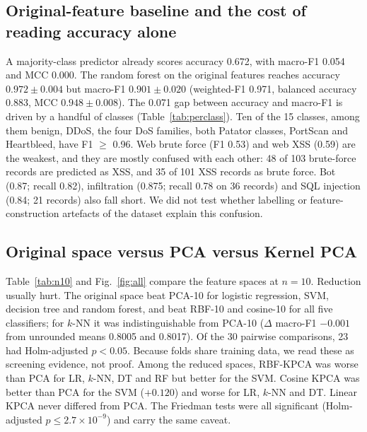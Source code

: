 \documentclass[runningheads]{llncs}
\begin{document}
\subsection{Original-feature baseline and the cost of reading accuracy alone}
A majority-class predictor already scores accuracy 0.672, with macro-F1 0.054 and MCC 0.000. The random forest on the original features reaches accuracy $0.972\pm0.004$ but macro-F1 $0.901\pm0.020$ (weighted-F1 0.971, balanced accuracy 0.883, MCC $0.948\pm0.008$). The 0.071 gap between accuracy and macro-F1 is driven by a handful of classes (Table~\ref{tab:perclass}). Ten of the 15 classes, among them benign, DDoS, the four DoS families, both Patator classes, PortScan and Heartbleed, have F1 $\ge$ 0.96. Web brute force (F1 0.53) and web XSS (0.59) are the weakest, and they are mostly confused with each other: 48 of 103 brute-force records are predicted as XSS, and 35 of 101 XSS records as brute force. Bot (0.87; recall 0.82), infiltration (0.875; recall 0.78 on 36 records) and SQL injection (0.84; 21 records) also fall short. We did not test whether labelling or feature-construction artefacts of the dataset explain this confusion.

\begin{table}[!htbp]
\caption{Per-class results of the selected model (RF, original features), pooled out-of-fold predictions, first repeat.}\label{tab:perclass}
\centering\scriptsize

\end{table}





\subsection{Original space versus PCA versus Kernel PCA}
Table~\ref{tab:n10} and Fig.~\ref{fig:all} compare the feature spaces at $n=10$. Reduction usually hurt. The original space beat PCA-10 for logistic regression, SVM, decision tree and random forest, and beat RBF-10 and cosine-10 for all five classifiers; for $k$-NN it was indistinguishable from PCA-10 ($\Delta$ macro-F1 $-0.001$ from unrounded means 0.8005 and 0.8017). Of the 30 pairwise comparisons, 23 had Holm-adjusted $p<0.05$. Because folds share training data, we read these as screening evidence, not proof. Among the reduced spaces, RBF-KPCA was worse than PCA for LR, $k$-NN, DT and RF but better for the SVM. Cosine KPCA was better than PCA for the SVM ($+0.120$) and worse for LR, $k$-NN and DT. Linear KPCA never differed from PCA. The Friedman tests were all significant (Holm-adjusted $p\le 2.7\times10^{-9}$) and carry the same caveat.
\end{document}
